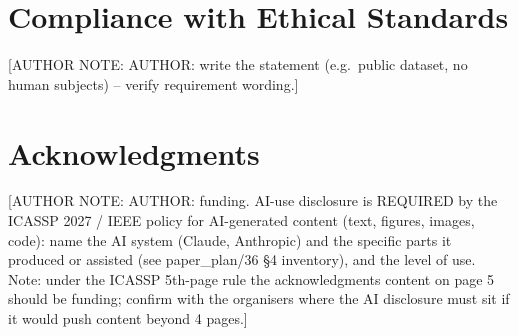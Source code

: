 \documentclass{article}
\newif\ifshownotes \shownotestrue
\newcommand{\authornote}[1]{\ifshownotes{\color{blue}\footnotesize[AUTHOR NOTE: #1]}\fi}
\begin{document}
\section{Compliance with Ethical Standards}
\authornote{AUTHOR: write the statement (e.g.\ public dataset, no human subjects) -- verify requirement wording.}

\section{Acknowledgments}
\authornote{AUTHOR: funding. AI-use disclosure is REQUIRED by the ICASSP 2027 / IEEE policy for AI-generated
content (text, figures, images, code): name the AI system (Claude, Anthropic) and the specific parts it produced or
assisted (see paper\_plan/36 \S4 inventory), and the level of use. Note: under the ICASSP 5th-page rule the
acknowledgments content on page 5 should be funding; confirm with the organisers where the AI disclosure must sit if
it would push content beyond 4 pages.}



\end{document}
